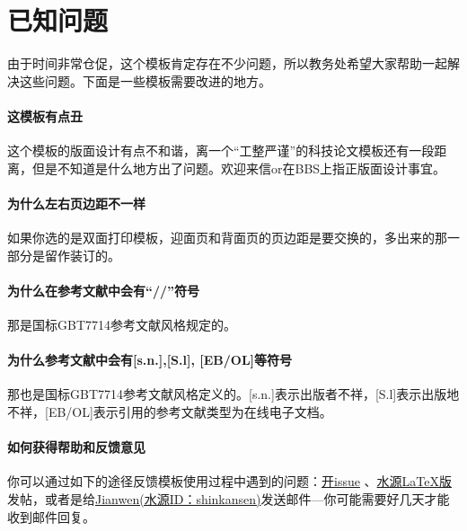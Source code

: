 

\chapter{已知问题}
\label{chap:needsomehelp}

由于时间非常仓促，这个模板肯定存在不少问题，所以教务处希望大家帮助一起解决这些问题。下面是一些模板需要改进的地方。

\subsubsection*{这模板有点丑}
这个模板的版面设计有点不和谐，离一个“工整严谨”的科技论文模板还有一段距离，但是不知道是什么地方出了问题。欢迎来信or在BBS上指正版面设计事宜。

\subsubsection*{为什么左右页边距不一样}
如果你选的是双面打印模板，迎面页和背面页的页边距是要交换的，多出来的那一部分是留作装订的。

\subsubsection*{为什么在参考文献中会有``//''符号}
那是国标GBT7714参考文献风格规定的。

\subsubsection*{为什么参考文献中会有[s.n.],[S.l], [EB/OL]等符号}
那也是国标GBT7714参考文献风格定义的。[s.n.]表示出版者不祥，[S.l]表示出版地不祥，[EB/OL]表示引用的参考文献类型为在线电子文档。

\subsubsection*{如何获得帮助和反馈意见}
你可以通过如下的途径反馈模板使用过程中遇到的问题：\href{https://github.com/weijianwen/sjtu-thesis-template-latex/issues}{开issue}
、\href{https://bbs.sjtu.edu.cn/bbsdoc?board=TeX_LaTeX}{水源LaTeX版}发帖，或者是给\href{mailto:weijianwen@gmail.com}{Jianwen(水源ID：shinkansen)}发送邮件---你可能需要好几天才能收到邮件回复。

